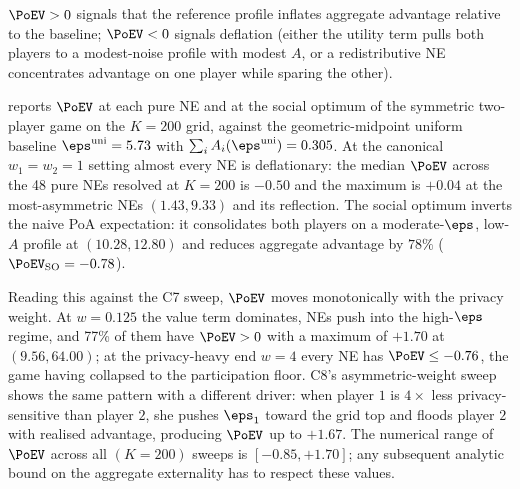 $\PoEV > 0$ signals that the reference profile inflates aggregate
advantage relative to the baseline; $\PoEV < 0$ signals deflation
(either the utility term pulls both players to a modest-noise
profile with modest $A$, or a redistributive NE concentrates advantage
on one player while sparing the other).



 reports $\PoEV$ at each pure NE and at the social
optimum of the symmetric two-player game on the $K = 200$ grid, against
the geometric-midpoint uniform baseline
$\eps^{\mathrm{uni}} = 5.73$ with
$\sum_i A_i(\boldsymbol{\eps}^{\mathrm{uni}}) = 0.305$. At the canonical
$w_1 = w_2 = 1$ setting almost every NE is deflationary: the median
$\PoEV$ across the 48 pure NEs resolved at $K = 200$ is $-0.50$ and
the maximum is $+0.04$ at the most-asymmetric NEs $(1.43, 9.33)$ and
its reflection. The social optimum inverts the naive PoA expectation:
it consolidates both players on a moderate-$\eps$, low-$A$ profile at
$(10.28, 12.80)$ and reduces aggregate advantage by $78\%$
($\PoEV_{\mathrm{SO}} = -0.78$).

Reading this against the C7 sweep, $\PoEV$ moves monotonically with the
privacy weight. At $w = 0.125$ the value term dominates, NEs push into
the high-$\eps$ regime, and 77\% of them have $\PoEV > 0$ with a
maximum of $+1.70$ at $(9.56, 64.00)$; at the privacy-heavy end
$w = 4$ every NE has $\PoEV \le -0.76$, the game having collapsed to
the participation floor. C8's asymmetric-weight sweep shows the same
pattern with a different driver: when player $1$ is $4\times$ less
privacy-sensitive than player $2$, she pushes $\eps_1$ toward the grid
top and floods player $2$ with realised advantage, producing $\PoEV$
up to $+1.67$. The numerical range of $\PoEV$ across all $(K = 200)$
sweeps is $[-0.85, +1.70]$; any subsequent analytic bound on the
aggregate externality has to respect these values.

